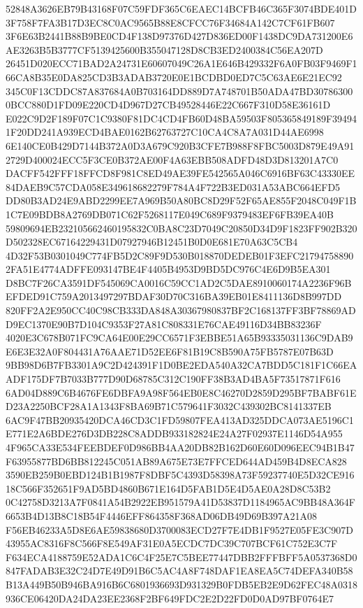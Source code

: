 \documentclass[UTF8,fontset=fandol,zihao=-4,a4paper]{ctexart}
\begin{document}
{{52848A3626EB79B43168F07C59FDF365C6EAEC14BCFB46C365F3074BDE401D3F758F7FA3B17D3EC8C0AC9565B88E8CFCC76F34684A142C7CF61FB607
3F6E63B2441B88B9BE0CD4F138D97376D427D836ED00F1438DC9DA731200E6AE3263B5B3777CF5139425600B355047128D8CB3ED2400384C56EA207D
26451D020ECC71BAD2A24731E60607049C26A1E646B429332F6A0FB03F9469F166CA8B35E0DA825CD3B3ADAB3720E0E1BCDBD0ED7C5C63AE6E21EC92
345C0F13CDDC87A837684A0B703164DD889D7A748701B50ADA47BD307863000BCC880D1FD09E220CD4D967D27CB49528446E22C667F310D58E36161D
E022C9D2F189F07C1C9380F81DC4CD4FB60D48BA59503F805365849189F394941F20DD241A939ECD4BAE0162B62763727C10CA4C8A7A031D44AE6998
6E140CE0B429D7144B372A0D3A679C920B3CFE7B988F8FBC5003D879E49A912729D400024ECC5F3CE0B372AE00F4A63EBB508ADFD48D3D813201A7C0
DACFF542FFF18FFCD8F981C8ED49AE39FE542565A046C6916BF63C43330EE84DAEB9C57CDA058E349618682279F784A4F722B3ED031A53ABC664EFD5
DD80B3AD24E9ABD2299EE7A969B50A80BC8D29F52F65AE855F2048C049F1B1C7E09BDB8A2769DB071C62F5268117E049C689F9379483EF6FB39EA40B
59809694EB232105662460195832C0BA8C23D7049C20850D34D9F1823FF902B320D502328EC67164229431D07927946B12451B0D0E681E70A63C5CB4
4D32F53B0301049C774FB5D2C89F9D530B018870DEDEB01F3EFC217947588902FA51E4774ADFFE093147BE4F4405B4953D9BD5DC976C4E6D9B5EA301
D8BC7F26CA3591DF545069CA0016C59CC1AD2C5DAE8910060174A2236F96BEFDED91C759A2013497297BDAF30D70C316BA39EB01E8411136D8B997DD
820FF2A2E950CC40C98CB333DA848A30367980837BF2C168137FF3BF78869ADD9EC1370E90B7D104C9353F27A81C808331E76CAE49116D34BB83236F
4020E3C678B071FC9CA64E00E29CC6571F3EBBE51A65B93335031136C9DAB9E6E3E32A0F804431A76AAE71D52EE6F81B19C8B590A75FB5787E07B63D
9BB98D6B7FB3301A9C2D424391F1D0BE2EDA540A32CA7BDD5C181F1C66EAADF175DF7B7033B777D90D68785C312C190FF38B3AD4BA5F73517871F616
6AD04D889C6B4676FE6DBFA9A98F564EB0E8C46270D2859D295BF7BABF61ED23A2250BCF28A1A1343F8BA69B71C579641F3032C439302BC8141337EB
6AC9F47BB20935420DCA46CD3C1FD59807FEA413AD325DDCA073AE5196C1E771E2A6BDE276D3DB228C8ADDB933182824E24A27F02937E1146D54A955
4F965CA33E534FEEBDEF0D986BB4AA20DB82B162D60E60D096EEC94B1B47F63955877BD6BB812245C051AB89A675E73E7FFCED644AD459B4D8ECA828
3590EB259B0EBD124B1B1987F8DBF5C4393D58398A73F59237740E5D32CE91618C566F352651F9AD5BD4860B671E164D5FAB1D5E4D5AE0A28D8C53B2
0C42758D3213A7F0841A54B2922EB951579A41D53837D1184965AC9BB48A364F6653B4D13B8C18B54F4446EFF864358F368AD06DB49D69B397A21A08
F56EB46233A5D8E6AE59838680D3700083ECD27F7E4DB1F9527E05FE3C907D43955AC8316F8C566F8E549AF31E0A5ECDC7DC39C707BCF61C752E3C7F
F634ECA4188759E52ADA1C6C4F25E7C5BEE77447DBB2FFFBFF5A0537368D0847FADAB3E32C24D7E49D91B6C5AC4A8F748DAF1EA8EA5C74DEFA340B58
B13A449B50B946BA916B6C6801936693D931329B0FDB5EB2E9D62FEC48A0318936CE06420DA24DA23EE2368F2BF649FDC2E2D22FD0D0AD97BF0764E7
}}
\end{document}
